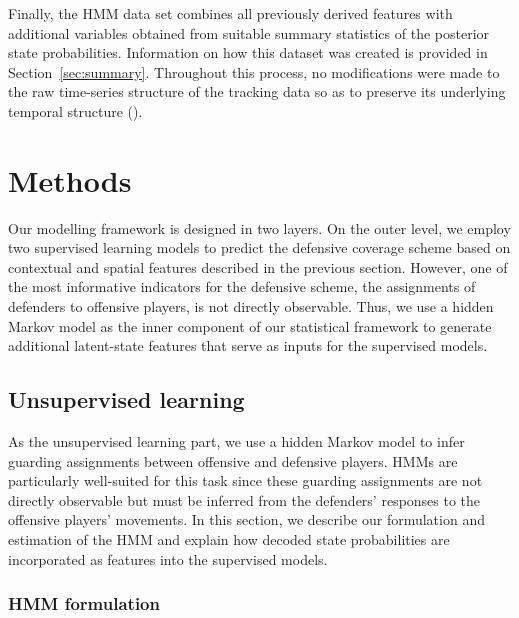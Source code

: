 \documentclass[namedate,webpdf,modern,medium]{oup-authoring-template}
\begin{document}
Finally, the HMM data set combines all previously derived features with additional variables obtained from suitable summary statistics of the posterior state probabilities. Information on how this dataset was created is provided in Section~\ref{sec:summary}. Throughout this process, no modifications were made to the raw time-series structure of the tracking data so as to preserve its underlying temporal structure (\citealp{michels2024combination}).

\section{Methods}\label{sec:methods}

Our modelling framework is designed in two layers. On the outer level, we employ two supervised learning models to predict the defensive coverage scheme based on contextual and spatial features described in the previous section. However, one of the most informative indicators for the defensive scheme, the assignments of defenders to offensive players, is not directly observable. Thus, we use a hidden Markov model as the inner component of our statistical framework to generate additional latent-state features that serve as inputs for the supervised models.

\subsection{Unsupervised learning}
As the unsupervised learning part, we use a hidden Markov model to infer guarding assignments between offensive and defensive players. HMMs are particularly well-suited for this task since these guarding assignments are not directly observable but must be inferred from the defenders' responses to the offensive players' movements. 
In this section, we describe our formulation and estimation of the HMM and explain how decoded state probabilities are incorporated as features into the supervised models.

\subsubsection{HMM formulation}
\end{document}
